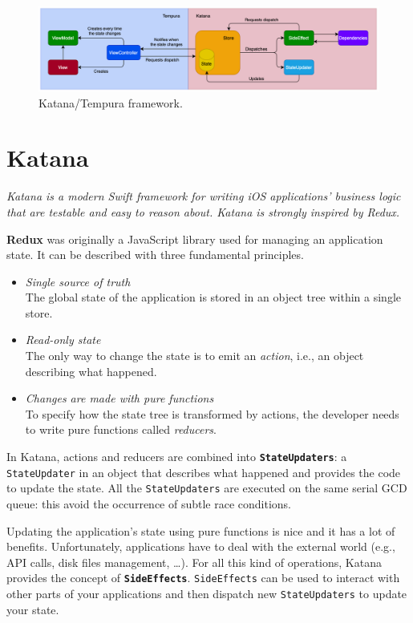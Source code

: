 \documentclass[a4paper, 11pt, parskip=half]{scrreprt}
\theoremstyle{definition}
\newenvironment{linedquote}{
	\begin{mdframed}[style=linedquote]
}{
	\end{mdframed}
}
\begin{document}
\begin{figure}[H]
    \centering
    \includegraphics[width=0.99\linewidth, keepaspectratio]{Katana-Tempura-light}
    \caption{Katana/Tempura framework.}
\end{figure}

\section{Katana}

\begin{linedquote}
    \textit{Katana is a modern Swift framework for writing iOS applications' business logic that are testable and easy to reason about. Katana is strongly inspired by Redux.}
\end{linedquote}

\textbf{Redux} was originally a JavaScript library used for managing an application state. It can be described with three fundamental principles.
\begin{itemize}
    \item \textit{Single source of truth} \\
    The global state of the application is stored in an object tree within a single store.
    \item \textit{Read-only state} \\
    The only way to change the state is to emit an \textit{action}, i.e., an object describing what happened.
    \item \textit{Changes are made with pure functions} \\
    To specify how the state tree is transformed by actions, the developer needs to write pure functions called \textit{reducers}.
\end{itemize}

In Katana, actions and reducers are combined into \textbf{\texttt{StateUpdaters}}: a \texttt{StateUpdater} in an object that describes what happened and provides the code to update the state. All the \texttt{StateUpdaters} are executed on the same serial GCD queue: this avoid the occurrence of subtle race conditions.

Updating the application's state using pure functions is nice and it has a lot of benefits. Unfortunately, applications have to deal with the external world (e.g., API calls, disk files management, …). For all this kind of operations, Katana provides the concept of \textbf{\texttt{SideEffects}}. \texttt{SideEffects} can be used to interact with other parts of your applications and then dispatch new \texttt{StateUpdaters} to update your state.
\end{document}
